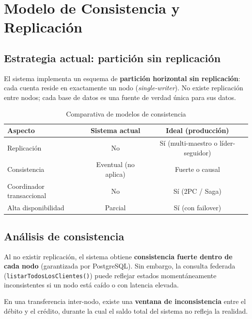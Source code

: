 \documentclass[12pt, a4paper]{article}
\begin{document}
\section{Modelo de Consistencia y Replicación}

\subsection{Estrategia actual: partición sin replicación}
El sistema implementa un esquema de \textbf{partición horizontal sin replicación}: cada cuenta reside en exactamente un nodo (\textit{single-writer}). No existe replicación entre nodos; cada base de datos es una fuente de verdad única para sus datos.

\begin{table}[H]
\centering
\caption{Comparativa de modelos de consistencia}
\begin{tabular}{@{} l c c @{}}
\toprule
\textbf{Aspecto} & \textbf{Sistema actual} & \textbf{Ideal (producción)} \\
\midrule
Replicación & No & Sí (multi-maestro o líder-seguidor) \\
Consistencia & Eventual (no aplica) & Fuerte o causal \\
Coordinador transaccional & No & Sí (2PC / Saga) \\
Alta disponibilidad & Parcial & Sí (con failover) \\
\bottomrule
\end{tabular}
\end{table}

\subsection{Análisis de consistencia}
Al no existir replicación, el sistema obtiene \textbf{consistencia fuerte dentro de cada nodo} (garantizada por PostgreSQL). Sin embargo, la consulta federada (\texttt{listarTodosLosClientes()}) puede reflejar estados momentáneamente inconsistentes si un nodo está caído o con latencia elevada.

En una transferencia inter-nodo, existe una \textbf{ventana de inconsistencia} entre el débito y el crédito, durante la cual el saldo total del sistema no refleja la realidad.

\end{document}
